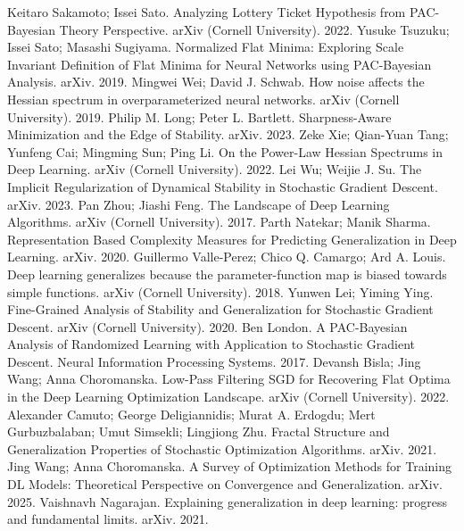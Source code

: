  Keitaro Sakamoto; Issei Sato. Analyzing Lottery Ticket Hypothesis from PAC-Bayesian Theory Perspective. arXiv (Cornell University). 2022.
 Yusuke Tsuzuku; Issei Sato; Masashi Sugiyama. Normalized Flat Minima: Exploring Scale Invariant Definition of Flat Minima for Neural Networks using PAC-Bayesian Analysis. arXiv. 2019.
 Mingwei Wei; David J. Schwab. How noise affects the Hessian spectrum in overparameterized neural networks. arXiv (Cornell University). 2019.
 Philip M. Long; Peter L. Bartlett. Sharpness-Aware Minimization and the Edge of Stability. arXiv. 2023.
 Zeke Xie; Qian-Yuan Tang; Yunfeng Cai; Mingming Sun; Ping Li. On the Power-Law Hessian Spectrums in Deep Learning. arXiv (Cornell University). 2022.
 Lei Wu; Weijie J. Su. The Implicit Regularization of Dynamical Stability in Stochastic Gradient Descent. arXiv. 2023.
 Pan Zhou; Jiashi Feng. The Landscape of Deep Learning Algorithms. arXiv (Cornell University). 2017.
 Parth Natekar; Manik Sharma. Representation Based Complexity Measures for Predicting Generalization in Deep Learning. arXiv. 2020.
 Guillermo Valle-Perez; Chico Q. Camargo; Ard A. Louis. Deep learning generalizes because the parameter-function map is biased towards simple functions. arXiv (Cornell University). 2018.
 Yunwen Lei; Yiming Ying. Fine-Grained Analysis of Stability and Generalization for Stochastic Gradient Descent. arXiv (Cornell University). 2020.
 Ben London. A PAC-Bayesian Analysis of Randomized Learning with Application to Stochastic Gradient Descent. Neural Information Processing Systems. 2017.
 Devansh Bisla; Jing Wang; Anna Choromanska. Low-Pass Filtering SGD for Recovering Flat Optima in the Deep Learning Optimization Landscape. arXiv (Cornell University). 2022.
 Alexander Camuto; George Deligiannidis; Murat A. Erdogdu; Mert Gurbuzbalaban; Umut Simsekli; Lingjiong Zhu. Fractal Structure and Generalization Properties of Stochastic Optimization Algorithms. arXiv. 2021.
 Jing Wang; Anna Choromanska. A Survey of Optimization Methods for Training DL Models: Theoretical Perspective on Convergence and Generalization. arXiv. 2025.
 Vaishnavh Nagarajan. Explaining generalization in deep learning: progress and fundamental limits. arXiv. 2021.
